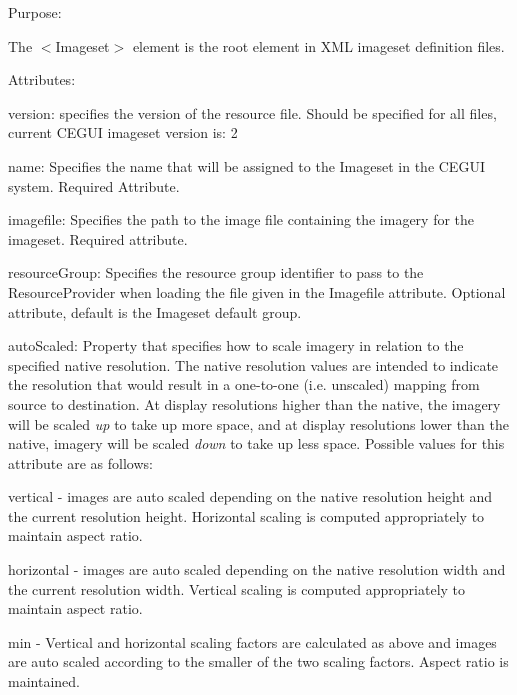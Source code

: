 \begin{DoxyItemize}
\item Purpose\+:
\begin{DoxyItemize}
\item The $<$Imageset$>$ element is the root element in X\+ML imageset definition files.
\end{DoxyItemize}
\item Attributes\+:
\begin{DoxyItemize}
\item {\ttfamily version\+:} specifies the version of the resource file. Should be specified for all files, current C\+E\+G\+UI imageset version is\+: 2
\item {\ttfamily name\+:} Specifies the name that will be assigned to the Imageset in the C\+E\+G\+UI system. Required Attribute.
\item {\ttfamily imagefile\+:} Specifies the path to the image file containing the imagery for the imageset. Required attribute.
\item {\ttfamily resource\+Group\+:} Specifies the resource group identifier to pass to the Resource\+Provider when loading the file given in the {\ttfamily Imagefile} attribute. Optional attribute, default is the Imageset default group.
\item {\ttfamily auto\+Scaled\+:} Property that specifies how to scale imagery in relation to the specified native resolution. The native resolution values are intended to indicate the resolution that would result in a one-\/to-\/one (i.\+e. unscaled) mapping from source to destination. At display resolutions higher than the native, the imagery will be scaled {\itshape up} to take up more space, and at display resolutions lower than the native, imagery will be scaled {\itshape down} to take up less space. Possible values for this attribute are as follows\+:
\begin{DoxyItemize}
\item vertical -\/ images are auto scaled depending on the native resolution height and the current resolution height. Horizontal scaling is computed appropriately to maintain aspect ratio.
\item horizontal -\/ images are auto scaled depending on the native resolution width and the current resolution width. Vertical scaling is computed appropriately to maintain aspect ratio.
\item min -\/ Vertical and horizontal scaling factors are calculated as above and images are auto scaled according to the smaller of the two scaling factors. Aspect ratio is maintained.

\end{DoxyItemize}
\end{DoxyItemize}
\end{DoxyItemize}
